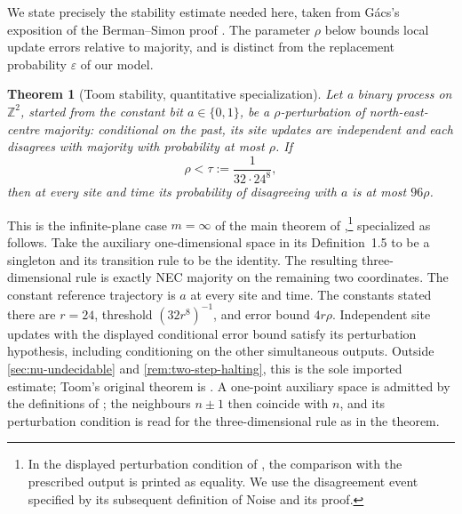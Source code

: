 \documentclass[11pt]{article}
\theoremstyle{plain}
\newtheorem{theorem}{Theorem}[section]
\theoremstyle{definition}
\theoremstyle{remark}
\newcommand{\Z}{\mathbb Z}
\newcommand{\eps}{\varepsilon}
\begin{document}
We state precisely the stability estimate needed here, taken from G\'acs's exposition \cite{Gacs21} of the Berman--Simon proof \cite{BermanSimon88}. The parameter $\rho$ below bounds local update errors relative to majority, and is distinct from the replacement probability $\eps$ of our model.

\begin{theorem}[Toom stability, quantitative specialization]\label{thm:toom}
Let a binary process on $\Z^2$, started from the constant bit $a\in\{0,1\}$, be a $\rho$-perturbation of north-east-centre majority: conditional on the past, its site updates are independent and each disagrees with majority with probability at most $\rho$. If
\begin{equation}\label{eq:toomconstant}
 \rho<\tau:=\frac1{32\cdot24^8},
\end{equation}
then at every site and time its probability of disagreeing with $a$ is at most $96\rho$.
\end{theorem}

This is the infinite-plane case $m=\infty$ of the main theorem of \cite{Gacs21},\footnote{In the displayed perturbation condition of \cite{Gacs21}, the comparison with the prescribed output is printed as equality. We use the disagreement event specified by its subsequent definition of $\mathrm{Noise}$ and its proof.} specialized as follows. Take the auxiliary one-dimensional space in its Definition~1.5 to be a singleton and its transition rule to be the identity. The resulting three-dimensional rule is exactly NEC majority on the remaining two coordinates. The constant reference trajectory is $a$ at every site and time. The constants stated there are $r=24$, threshold $(32r^8)^{-1}$, and error bound $4r\rho$. Independent site updates with the displayed conditional error bound satisfy its perturbation hypothesis, including conditioning on the other simultaneous outputs. Outside \cref{sec:nu-undecidable} and \cref{rem:two-step-halting}, this is the sole imported estimate; Toom's original theorem is \cite{Toom80}. A one-point auxiliary space is admitted by the definitions of \cite{Gacs21}; the neighbours $n\pm1$ then coincide with $n$, and its perturbation condition is read for the three-dimensional rule as in the theorem.
\end{document}
